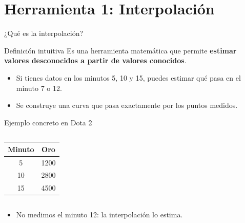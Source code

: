 \section{Herramienta 1: Interpolación}

\begin{frame}{¿Qué es la interpolación?}
  \begin{block}{Definición intuitiva}
    Es una herramienta matemática que permite \textbf{estimar valores desconocidos a partir de valores conocidos}.
  \end{block}
  \vspace{0.5em}
  \begin{itemize}
    \item Si tienes datos en los minutos 5, 10 y 15, puedes estimar qué pasa en el minuto 7 o 12.
    \item Se construye una curva que pasa exactamente por los puntos medidos.
  \end{itemize}
\end{frame}

\begin{frame}{Ejemplo concreto en Dota 2}
  \begin{columns}
    \begin{center}
      \begin{tabular}{cc}
        \toprule
        Minuto & Oro \\
        \midrule
        5  & 1200 \\
        10 & 2800 \\
        15 & 4500 \\
        \bottomrule
      \end{tabular}
    \end{center}
  \end{columns}
  \vspace{0.3em}
  \begin{itemize}
    \item No medimos el minuto 12: la interpolación lo estima.
  \end{itemize}
\end{frame}

